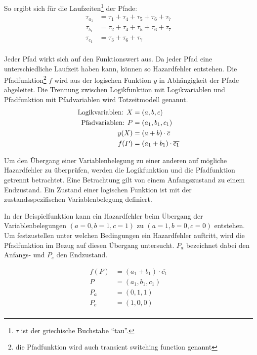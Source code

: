 So ergibt sich für die Laufzeiten\footnote{$\tau$ ist der griechische Buchstabe "`tau"'.} der Pfade:
\begin{align*}
	\tau_{a_1} &= \tau_1 + \tau_4 + \tau_5 + \tau_6 + \tau_7 \\
	\tau_{b_1} &= \tau_2 + \tau_4 + \tau_5 + \tau_6 + \tau_7 \\
	\tau_{c_1} &= \tau_3 + \tau_6 + \tau_7 \\
\end{align*}

Jeder Pfad wirkt sich auf den Funktionswert aus. Da jeder Pfad eine unterschiedliche Laufzeit haben kann, können so Hazardfehler entstehen. Die Pfadfunktion\footnote{die Pfadfunktion wird auch transient switching function genannt} $f$ wird aus der logischen Funktion $y$ in Abhängigkeit der Pfade abgeleitet. Die Trennung zwischen Logikfunktion mit Logikvariablen und Pfadfunktion mit Pfadvariablen wird Totzeitmodell genannt.
\begin{align*}
	\textnormal{Logikvariablen: } X &= (a, b, c) \\
	\textnormal{Pfadvariablen: } P &= (a_1, b_1, c_1) \\
	y(X) &= (a + b) \cdot \overline{c} \\
	f(P) &= (a_1 + b_1) \cdot \overline{c_1} \\	
\end{align*}  

Um den Übergang einer Variablenbelegung zu einer anderen auf mögliche Hazardfehler zu überprüfen, werden die Logikfunktion und die Pfadfunktion getrennt betrachtet. Eine Betrachtung gilt von einem Anfangszustand zu einem Endzustand. Ein Zustand einer logischen Funktion ist mit der zustandsspezifischen Variablenbelegung definiert.

In der Beispielfunktion kann ein Hazardfehler beim Übergang der Variablenbelegungen $(a=0, b=1, c=1)$ zu $(a=1, b=0, c=0)$ entstehen. Um festzustellen unter welchen Bedingungen ein Hazardfehler auftritt, wird die Pfadfunktion im Bezug auf diesen Übergang untersucht. $P_a$ bezeichnet dabei den Anfangs- und $P_e$ den Endzustand.

\begin{align*}
	f(P) &= (a_1 + b_1) \cdot \overline{c_1} \\
	P    &= (a_1, b_1, c_1) \\
	P_a  &= (0,1,1) \\
	P_e  &= (1,0,0) \\
\end{align*}

